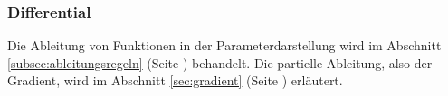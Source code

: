 \subsubsection{Differential}
Die Ableitung von Funktionen in der Parameterdarstellung wird im Abschnitt
\ref{subsec:ableitungsregeln} (Seite \pageref{subsec:ableitungsregeln})
behandelt. Die partielle Ableitung, also der Gradient, wird im Abschnitt
\ref{sec:gradient} (Seite \pageref{sec:gradient}) erläutert.
